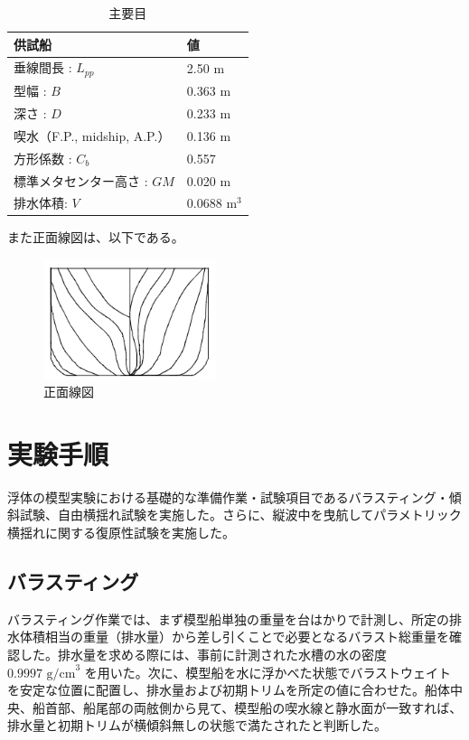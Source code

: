 \documentclass[dvipdfmx,a4paper]{jreport} %
\begin{document}
\begin{table}[htbp]
    \caption{主要目}
    \label{tab:principal_particulars}
    \centering
    \begin{tabular}{|l|l|}
        \hline
        \textbf{供試船} & \textbf{値} \\
        \hline
        垂線間長 : $L_{pp}$ & 2.50 m \\
        型幅 : $B$ & 0.363 m \\
        深さ : $D$ & 0.233 m \\
        喫水（F.P., midship, A.P.） & 0.136 m \\
        方形係数 : $C_b$ & 0.557 \\
        標準メタセンター高さ : $GM$ & 0.020 m \\
        排水体積: $V$ & 0.0688 m$^3$ \\
        \hline
    \end{tabular}
\end{table}
また正面線図は、以下である。
\begin{figure}[H] %
    \centering
    \includegraphics[width=0.45\textwidth]{summer/ship-experiment/long-pool/buttock-lines.png} %
     \caption{正面線図}
     \label{fig:Buttock lines}
\end{figure}

\section{実験手順}
浮体の模型実験における基礎的な準備作業・試験項目であるバラスティング・傾斜試験、自由横揺れ試験を実施した。さらに、縦波中を曳航してパラメトリック横揺れに関する復原性試験を実施した。

\subsection{バラスティング}
バラスティング作業では、まず模型船単独の重量を台はかりで計測し、所定の排水体積相当の重量（排水量）から差し引くことで必要となるバラスト総重量を確認した。排水量を求める際には、事前に計測された水槽の水の密度 $0.9997 \text{ g/cm}^3$ を用いた。次に、模型船を水に浮かべた状態でバラストウェイトを安定な位置に配置し、排水量および初期トリムを所定の値に合わせた。船体中央、船首部、船尾部の両舷側から見て、模型船の喫水線と静水面が一致すれば、排水量と初期トリムが横傾斜無しの状態で満たされたと判断した。
\end{document}
